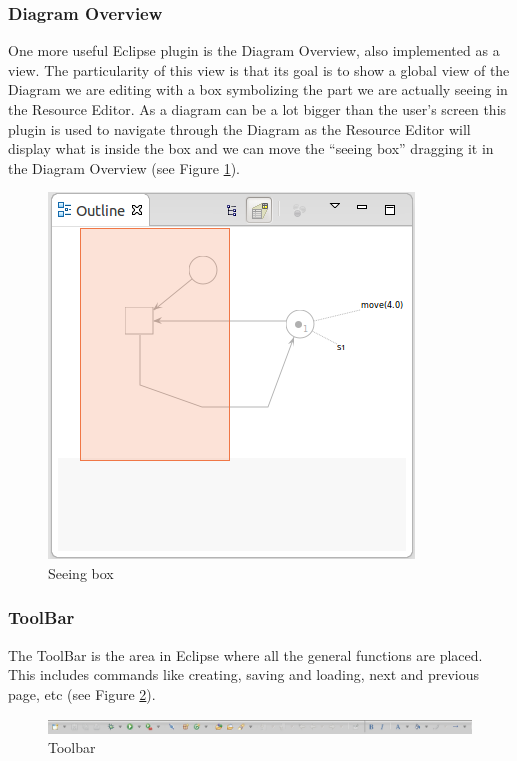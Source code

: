 \subsubsection{Diagram Overview}
One more useful Eclipse plugin is the Diagram Overview, also implemented as a view. The particularity of this view is that its goal is to show a global view of the Diagram we are editing with a box symbolizing the part we are actually seeing in the Resource Editor. As a diagram can be a lot bigger than the user's screen this plugin is used to navigate through the Diagram as the Resource Editor will display what is inside the box and we can move the ``seeing box'' dragging it in the Diagram Overview (see Figure \ref{fig:gui_diagram_overview}).

\begin{figure}[htp]
\begin{center}
  \includegraphics[scale=0.50]{image/gui_diagram_overview.png}
  \caption{Seeing box}
  \label{fig:gui_diagram_overview}
\end{center}
\end{figure}

\subsubsection{ToolBar}
The ToolBar is the area in Eclipse where all the general functions are placed. This includes commands like creating, saving and loading, next and previous page, etc (see Figure \ref{fig:gui_toolbar}).

\begin{figure}[htp]
\begin{center}
  \includegraphics[scale=0.40]{image/gui_toolbar.png}
  \caption{Toolbar}
  \label{fig:gui_toolbar}
\end{center}
\end{figure}

